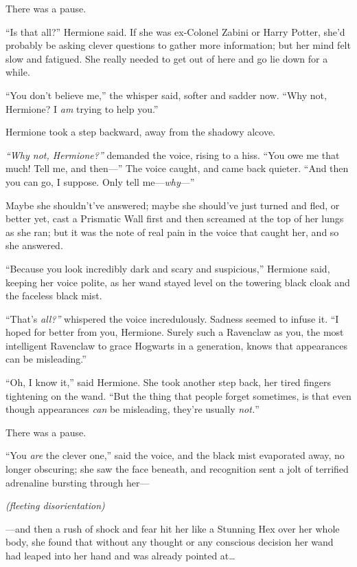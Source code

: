 There was a pause.

``Is that all?'' Hermione said. If she was ex-Colonel Zabini or Harry
Potter, she'd probably be asking clever questions to gather more
information; but her mind felt slow and fatigued. She really needed to
get out of here and go lie down for a while.

``You don't believe me,'' the whisper said, softer and sadder now. ``Why
not, Hermione? I \emph{am} trying to help you.''

Hermione took a step backward, away from the shadowy alcove.

\emph{``Why not, Hermione?''} demanded the voice, rising to a hiss.
``You owe me that much! Tell me, and then---'' The voice caught, and
came back quieter. ``And then you can go, I suppose. Only tell
me---\emph{why}---''

Maybe she shouldn't've answered; maybe she should've just turned and
fled, or better yet, cast a Prismatic Wall first and then screamed at
the top of her lungs as she ran; but it was the note of real pain in the
voice that caught her, and so she answered.

``Because you look incredibly dark and scary and suspicious,'' Hermione
said, keeping her voice polite, as her wand stayed level on the towering
black cloak and the faceless black mist.

``That's \emph{all?''} whispered the voice incredulously. Sadness seemed
to infuse it. ``I hoped for better from you, Hermione. Surely such a
Ravenclaw as you, the most intelligent Ravenclaw to grace Hogwarts in a
generation, knows that appearances can be misleading.''

``Oh, I know it,'' said Hermione. She took another step back, her tired
fingers tightening on the wand. ``But the thing that people forget
sometimes, is that even though appearances \emph{can} be misleading,
they're usually \emph{not.}''

There was a pause.

``You \emph{are} the clever one,'' said the voice, and the black mist
evaporated away, no longer obscuring; she saw the face beneath, and
recognition sent a jolt of terrified adrenaline bursting through her---

\emph{(fleeting disorientation)}

---and then a rush of shock and fear hit her like a Stunning Hex over
her whole body, she found that without any thought or any conscious
decision her wand had leaped into her hand and was already pointed
at\ldots{}

